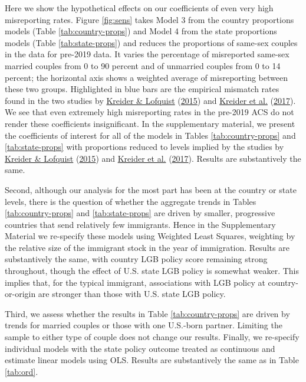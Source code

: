 \documentclass[
  11pt,
]{article}
\begin{document}
Here we show the hypothetical effects on our coefficients of even very high misreporting rates. Figure \ref{fig:sens} takes Model 3 from the country proportions models (Table \ref{tab:country-props}) and Model 4 from the state proportions models (Table \ref{tab:state-props}) and reduces the proportions of same-sex couples in the data for pre-2019 data. It varies the percentage of misreported same-sex married couples from 0 to 90 percent and of unmarried couples from 0 to 14 percent; the horizontal axis shows a weighted average of misreporting between these two groups. Highlighted in blue bars are the empirical mismatch rates found in the two studies by \protect\hyperlink{ref-kreider_2015}{Kreider \& Lofquist} (\protect\hyperlink{ref-kreider_2015}{2015}) and \protect\hyperlink{ref-kreider_2017}{Kreider et al.} (\protect\hyperlink{ref-kreider_2017}{2017}). We see that even extremely high misreporting rates in the pre-2019 ACS do not render these coefficients insignificant. In the supplementary material, we present the coefficients of interest for all of the models in Tables \ref{tab:country-props} and \ref{tab:state-props} with proportions reduced to levels implied by the studies by \protect\hyperlink{ref-kreider_2015}{Kreider \& Lofquist} (\protect\hyperlink{ref-kreider_2015}{2015}) and \protect\hyperlink{ref-kreider_2017}{Kreider et al.} (\protect\hyperlink{ref-kreider_2017}{2017}). Results are substantively the same.

Second, although our analysis for the most part has been at the country or state levels, there is the question of whether the aggregate trends in Tables \ref{tab:country-props} and \ref{tab:state-props} are driven by smaller, progressive countries that send relatively few immigrants. Hence in the Supplementary Material we re-specify these models using Weighted Least Squares, weighting by the relative size of the immigrant stock in the year of immigration. Results are substantively the same, with country LGB policy score remaining strong throughout, though the effect of U.S. state LGB policy is somewhat weaker. This implies that, for the typical immigrant, associations with LGB policy at country-or-origin are stronger than those with U.S. state LGB policy.

Third, we assess whether the results in Table \ref{tab:country-props} are driven by trends for married couples or those with one U.S.-born partner. Limiting the sample to either type of couple does not change our results. Finally, we re-specify individual models with the state policy outcome treated as continuous and estimate linear models using OLS. Results are substantively the same as in Table \ref{tab:ord}.
\end{document}
